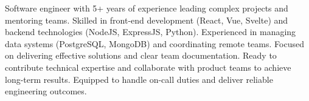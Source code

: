 
\begin{cvparagraph}
  Software engineer with 5+ years of experience leading complex projects and mentoring teams. Skilled in front-end development (React, Vue, Svelte) and backend technologies (NodeJS, ExpressJS, Python). Experienced in managing data systems (PostgreSQL, MongoDB) and coordinating remote teams. Focused on delivering effective solutions and clear team documentation. Ready to contribute technical expertise and collaborate with product teams to achieve long-term results. Equipped to handle on-call duties and deliver reliable engineering outcomes.
\end{cvparagraph}
